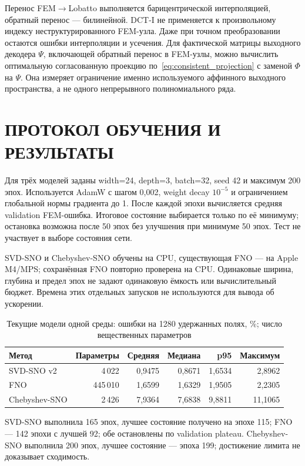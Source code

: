 \documentclass[notitle]{sibjima_preview}
\begin{document}
Перенос FEM\(\to\)Lobatto выполняется барицентрической интерполяцией, обратный перенос --- билинейной. DCT-I не применяется к произвольному индексу неструктурированного FEM-узла. Даже при точном преобразовании остаются ошибки интерполяции и усечения. Для фактической матрицы выходного декодера \(\Psi\), включающей обратный перенос в FEM-узлы, можно вычислить оптимальную согласованную проекцию по~\eqref{eq:consistent_projection} с заменой \(\Phi\) на \(\Psi\). Она измеряет ограничение именно используемого аффинного выходного пространства, а не одного непрерывного полиномиального ряда.

\section{ПРОТОКОЛ ОБУЧЕНИЯ И РЕЗУЛЬТАТЫ}
Для трёх моделей заданы width=24, depth=3, batch=32, seed 42 и максимум 200 эпох. Используется AdamW с шагом 0,002, weight decay \(10^{-5}\) и ограничением глобальной нормы градиента до 1. После каждой эпохи вычисляется средняя validation FEM-ошибка. Итоговое состояние выбирается только по её минимуму; остановка возможна после 50 эпох без улучшения при минимуме 50 эпох. Тест не участвует в выборе состояния сети.

SVD-SNO и Chebyshev-SNO обучены на CPU, существующая FNO --- на Apple M4/MPS; сохранённая FNO повторно проверена на CPU. Одинаковые ширина, глубина и предел эпох не задают одинаковую ёмкость или вычислительный бюджет. Времена этих отдельных запусков не используются для вывода об ускорении.

\begin{table}[htbp]
\centering
\caption{Текущие модели одной среды: ошибки на 1280 удержанных полях, \%; число вещественных параметров}
\label{tab:results}
\begin{tabular}{@{}lrrrrr@{}}
\toprule
Метод & Параметры & Средняя & Медиана & p95 & Максимум\\
\midrule
SVD-SNO v2 & 4\,022 & 0,9475 & 0,8671 & 1,6534 & 2,8962\\
FNO & 445\,010 & 1,6599 & 1,6329 & 1,9505 & 2,2305\\
Chebyshev-SNO & 2\,426 & 7,9364 & 7,6838 & 9,8811 & 11,1065\\
\bottomrule
\end{tabular}
\end{table}

SVD-SNO выполнила 165 эпох, лучшее состояние получено на эпохе 115; FNO --- 142 эпохи с лучшей 92; обе остановлены по validation plateau. Chebyshev-SNO выполнила 200 эпох, лучшее состояние --- эпоха 199; достижение лимита не доказывает сходимость.
\end{document}
